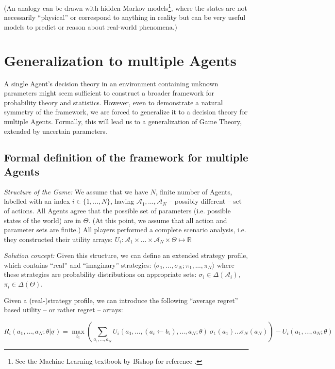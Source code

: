 \documentclass{article}
\begin{document}
(An analogy can be drawn with hidden Markov models\footnote{See the Machine Learning textbook by Bishop for reference \cite{book:Bishop}.}, where the states are not necessarily ``physical'' or correspond to anything in reality but can be very useful models to predict or reason about real-world phenomena.)


\section*{Generalization to multiple Agents}

A single Agent's decision theory in an environment containing unknown parameters might seem sufficient to construct a broader framework for probability theory and statistics. However, even to demonstrate a natural symmetry of the framework, we are forced to generalize it to a decision theory for multiple Agents. Formally, this will lead us to a generalization of Game Theory, extended by uncertain parameters.

\subsection*{Formal definition of the framework for multiple Agents}

{\it Structure of the Game:}
We assume that we have $N$, finite number of Agents, labelled with an index $i \in \{1,\dots,N\}$, having $\mathcal{A}_1,\dots,\mathcal{A}_N$ -- possibly different -- set of actions.
All Agents agree that the possible set of parameters (i.e. possible states of the world) are in $\Theta$.
(At this point, we assume that all action and parameter sets are finite.)
All players performed a complete scenario analysis, i.e. they constructed their utility arrays:
$U_i : \mathcal{A}_1 \times \dots \times \mathcal{A}_N \times \Theta \mapsto \mathbb{R}$

{\it Solution concept:}
Given this structure, we can define an extended strategy profile, which contains ``real'' and ``imaginary'' strategies: $\langle \sigma_1,\dots,\sigma_N; \pi_1,\dots,\pi_N \rangle$ where these strategies are probability distributions on appropriate sets:
$\sigma_i \in \Delta(\mathcal{A}_i)$, $\pi_i \in \Delta(\Theta)$.

Given a (real-)strategy profile, we can introduce the following ``average regret'' based utility -- or rather regret --  arrays:

\[
R_i (a_1,\dots,a_N;\theta | \underline{\sigma}) = \max_{b_i} 
\left (
\sum_{a_1,\dots,a_N} U_i(a_1,\dots,(a_i \leftarrow b_i),\dots,a_N;\theta) \ 
\sigma_1(a_1) \dots \sigma_N(a_N)
\right )
- U_i(a_1,\dots,a_N;\theta)
\]
\end{document}
